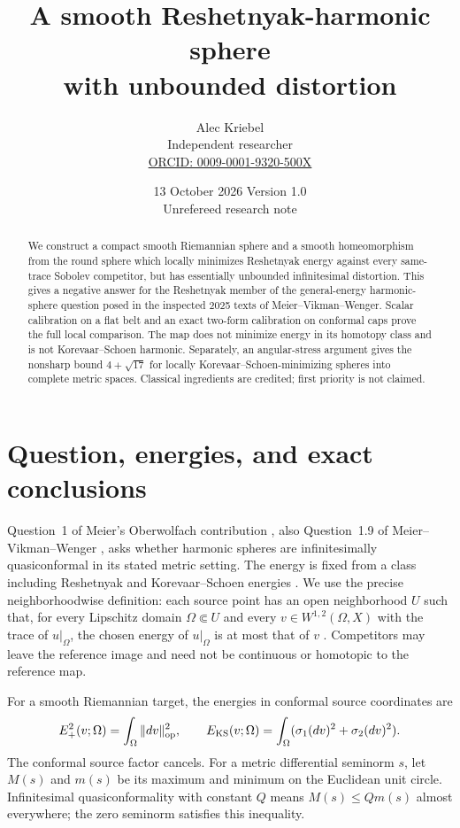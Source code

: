 \documentclass[11pt]{article}
\title{A smooth Reshetnyak-harmonic sphere\\with unbounded distortion}
\author{Alec Kriebel\\\small Independent researcher\\\small\href{https://orcid.org/0009-0001-9320-500X}{ORCID: 0009-0001-9320-500X}}
\date{13 October 2026 \quad Version 1.0\\\small Unrefereed research note}
\newcommand{\Ep}{E_+^2}
\newcommand{\EK}{E_{\rm KS}}
\newcommand{\op}{\operatorname{op}}
\begin{document}
\maketitle
\begin{abstract}
We construct a compact smooth Riemannian sphere and a smooth homeomorphism
from the round sphere which locally minimizes Reshetnyak energy against every
same-trace Sobolev competitor, but has essentially unbounded infinitesimal
distortion. This gives a negative answer for the Reshetnyak member of the
general-energy harmonic-sphere question posed in the inspected 2025 texts of
Meier--Vikman--Wenger. Scalar calibration on a flat belt and an exact two-form
calibration on conformal caps prove the full local comparison. The map does
not minimize energy in its homotopy class and is not Korevaar--Schoen harmonic.
Separately, an angular-stress argument gives the nonsharp bound
$4+\sqrt{17}$ for locally Korevaar--Schoen-minimizing spheres into complete
metric spaces. Classical ingredients are credited; first priority is not claimed.
\end{abstract}

\section{Question, energies, and exact conclusions}
Question~1 of Meier's Oberwolfach contribution \cite[p.~1625]{owr}, also
Question~1.9 of Meier--Vikman--Wenger \cite{mvw}, asks whether harmonic spheres
are infinitesimally quasiconformal in its stated metric setting. The energy is
fixed from a class including Reshetnyak and Korevaar--Schoen energies
\cite[Definition~3.1]{mvw}. We use the precise neighborhoodwise definition:
each source point has an open neighborhood $U$ such that, for every Lipschitz
domain $\Omega\Subset U$ and every $v\in W^{1,2}(\Omega,X)$ with the trace of
$u|_\Omega$, the chosen energy of $u|_\Omega$ is at most that of $v$
\cite[Definition~6.1]{mvw}. Competitors may leave the reference image and need
not be continuous or homotopic to the reference map.

For a smooth Riemannian target, the energies in conformal source coordinates are
\[
 \Ep(v;\Omega)=\int_\Omega\|dv\|_{\op}^2,
 \qquad \EK(v;\Omega)=\int_\Omega(\sigma_1(dv)^2+\sigma_2(dv)^2).
\]
The conformal source factor cancels. For a metric differential seminorm $s$,
let $M(s)$ and $m(s)$ be its maximum and minimum on the Euclidean unit circle.
Infinitesimal quasiconformality with constant $Q$ means
$M(s)\le Qm(s)$ almost everywhere; the zero seminorm satisfies this inequality.
\end{document}
